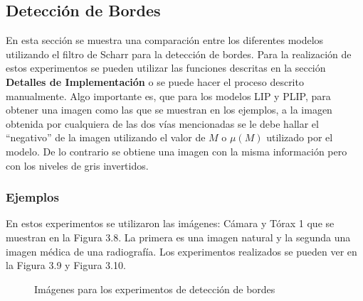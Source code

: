 \subsection{Detecci\'on de Bordes}

En esta secci\'on se muestra una comparaci\'on entre los diferentes modelos utilizando el filtro de Scharr para la detecci\'on de bordes. Para la realizaci\'on de estos experimentos se pueden utilizar las funciones descritas en la secci\'on \textbf{Detalles de Implementaci\'on} o se puede hacer el proceso descrito manualmente. Algo importante es, que para los modelos LIP y PLIP, para obtener una imagen como las que se muestran en los ejemplos, a la imagen obtenida por cualquiera de las dos v\'ias mencionadas se le debe hallar el ``negativo'' de la imagen utilizando el valor de $M$ o $\mu(M)$ utilizado por el modelo. De lo contrario se obtiene una imagen con la misma informaci\'on pero con los niveles de gris invertidos.

\subsubsection{Ejemplos}

En estos experimentos se utilizaron las im\'agenes: C\'amara y T\'orax 1 que se muestran en la Figura 3.8. La primera es una imagen natural y la segunda una imagen m\'edica de una radiograf\'ia. Los experimentos realizados se pueden ver en la Figura 3.9 y Figura 3.10.

\begin{figure}[h]
	\begin{center}
		\caption{Im\'agenes para los experimentos de detecci\'on de bordes}
	\end{center}
\end{figure}

